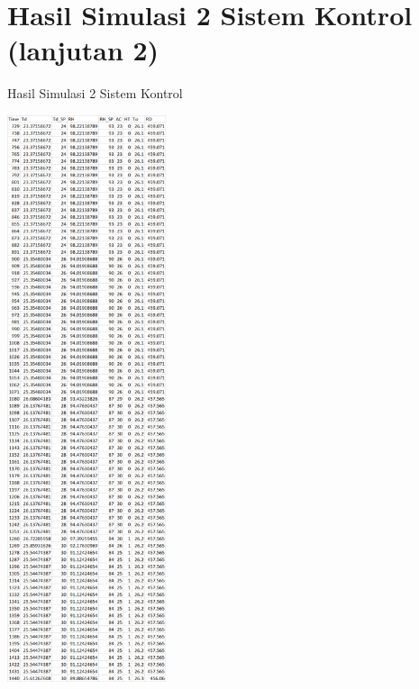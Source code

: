 \section{Hasil Simulasi 2 Sistem Kontrol (lanjutan 2)}
\begin{table}[!h]
	\caption{Hasil Simulasi 2 Sistem Kontrol}
	\label{tbl:A:HasilSimulasiKontrol22}
	\centering
	\includegraphics[width=0.35\textwidth]{figures/HasilSimulasiSimulink22}
\end{table}
\break

